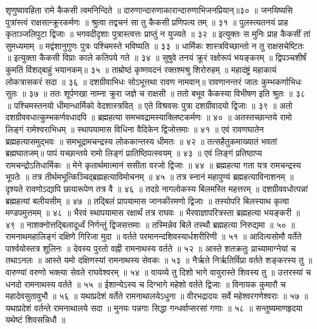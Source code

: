 शृणुष्वावहिता रामे कैकसी त्वमनिन्दिते ॥
दारुणान्दारुणाकारान्दारुणाभिजनप्रियान्॥३० ॥
जनयिष्यसि पुत्रांस्त्वं राक्षसान्क्रूरकर्मणः ॥
श्रुत्वा तद्वचनं सा तु कैकसी प्रणिपत्य तम् ॥ ३१ ॥
पुलस्त्यतनयं प्राह कृताञ्जलिपुटा द्विजाः ॥
भगवदीदृशाः पुत्रास्त्वत्तः प्राप्तुं न युज्यते ॥ ३२ ॥
इत्युक्तः स मुनिः प्राह कैकसीं तां सुमध्यमाम् ॥
मद्वंशानुगुणः पुत्रः पश्चिमस्ते भविष्यति ॥ ३३ ॥
धार्मिकः शास्त्रविच्छान्तो न तु राक्षसचेष्टितः ॥
इत्युक्ता कैकसी विप्राः काले कतिपये गते ॥ ३४ ॥
सुषुवे तनयं क्रूरं रक्षोरूपं भयङ्करम् ॥
द्विपञ्चशीर्षं कुमतिं विंशद्बाहुं भयानकम्॥ ३५ ॥
ताम्रोष्ठं कृष्णवदनं रक्तश्मश्रु शिरोरुहम् ॥
महादंष्ट्रं महाकायं लोकत्रासकरं सदा ॥ ३६ ॥
दशग्रीवाभिधः सोऽभूत्तथा रावण नामवान्॥
रावणानन्तरं जातः कुम्भकर्णाभिधः सुतः ॥ ३७ ॥
ततः शूर्पणखा नाम्ना क्रूरा जज्ञे च राक्षसी ॥
ततो बभूव कैकस्या विभीषण इति श्रुतः ॥ ३८ ॥
पश्चिमस्तनयो धीमान्धार्मिको वेदशास्त्रवित् ॥
एते विश्रवसः पुत्रा दशग्रीवादयो द्विजाः ॥ ३९ ॥
अतो दशग्रीववधात्कुम्भकर्णवधादपि ॥
ब्रह्महत्या समभवद्रामस्याक्लिष्टकर्मणः ॥ ४० ॥
अतस्तच्छान्तये रामो लिङ्गं रामेश्वराभिधम् ॥
स्थापयामास विधिना वैदिकेन द्विजोत्तमाः ॥ ४१ ॥
एवं रावणघातेन ब्रह्महत्यासमुद्भवः ॥
समभूद्रामचन्द्रस्य लोककान्तस्य धीमतः ॥ ४२ ॥
तत्सहैतुकमाख्यातं भवतां ब्रह्मघातजम्॥
पापं यच्छान्तये रामो लिङ्गं प्रातिष्ठिपत्स्वयम् ॥ ४३ ॥
एवं लिङ्गं प्रतिष्ठाप्य रामचन्द्रोऽतिधार्मिकः ॥
मेने कृतार्थमात्मानं ससीता वरजो द्विजाः ॥ ४४ ॥
ब्रह्महत्या गता यत्र रामचन्द्रस्य भूपतेः ॥
तत्र तीर्थमभूत्किञ्चिद्ब्रह्महत्याविमोचनम् ॥ ४५ ॥
तत्र स्नानं महापुण्यं ब्रह्महत्याविनाशनम् ॥
दृश्यते रावणोऽद्यापि छायारूपेण तत्र वै ॥ ४६ ॥
तदग्रे नागलोकस्य बिलमस्ति महत्तरम् ॥
दशग्रीववधोत्पन्नां ब्रह्महत्यां बलीयसीम् ॥ ४७ ॥
तद्बिलं प्रापयामास जानकीरमणो द्विजाः ॥
तस्योपरि बिलस्याथ कृत्वा मण्डपमुत्तमम् ॥ ४८ ॥
भैरवं स्थापयामास रक्षार्थं तत्र राघवः ॥
भैरवाज्ञापरित्रस्ता ब्रह्महत्या भयङ्करी ॥ ४९ ॥
नाशक्नोत्तद्बिलादूर्ध्वं निर्गन्तुं द्विजसत्तमाः ॥
तस्मिन्नेव बिले तस्थौ ब्रह्महत्या निरुद्यमा ॥ ५० ॥
रामनाथमहालिङ्गं दक्षिणे गिरिजा मुदा ॥
वर्तते परमानन्दशिवस्यार्धशरीरिणी ॥ ५१ ॥
आदित्यसोमौ वर्तेते पार्श्वयोस्तत्र शूलिनः ॥
देवस्य पुरतो वह्नी रामनाथस्य वर्तते ॥ ५२ ॥
आस्ते शतक्रतुः प्राच्यामाग्नेयां च तथाऽनलः ॥
आस्ते यमो दक्षिणस्यां रामनाथस्य सेवकः ॥ ५३ ॥
नैर्ऋते निर्ऋतिर्विप्रा वर्तते शङ्करस्य तु ॥
वारुण्यां वरुणो भक्त्या सेवते राघवेश्वरम् ॥ ५४ ॥
वायव्ये तु दिशो भागे वायुरास्ते शिवस्य तु ॥
उत्तरस्यां च धनदो रामनाथस्य वर्तते ॥ ५५ ॥
ईशान्येऽस्य च दिग्भागे महेशो वर्तते द्विजाः ॥
विनायक कुमारौ च महादेवसुतावुभौ ॥ ५६ ॥
यथाप्रदेशं वर्तेते रामनाथालयेऽधुना ॥
वीरभद्रादयः सर्वे महेश्वरगणेश्वराः ॥ ५७ ॥
यथाप्रदेशं वर्तन्ते रामनाथालये सदा ॥
मुनयः पन्नगाः सिद्धा गन्धर्वाप्सरसां गणाः ॥ ५८ ॥
सन्तुष्यमाणहृदया यथेष्टं शिवसन्निधौ ॥
